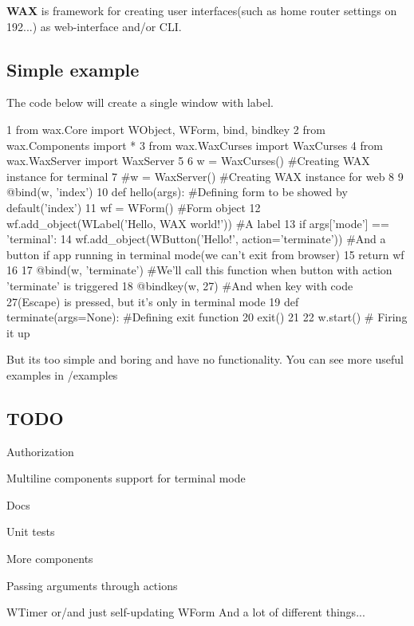 {\bfseries W\+AX} is framework for creating user interfaces(such as home router settings on 192...) as web-\/interface and/or C\+LI.

\subsection*{Simple example }

The code below will create a single window with label.


\begin{DoxyCode}
1 from wax.Core import WObject, WForm, bind, bindkey
2 from wax.Components import *
3 from wax.WaxCurses import WaxCurses
4 from wax.WaxServer import WaxServer
5 
6 w = WaxCurses()                                            #Creating WAX instance for terminal
7 #w = WaxServer()                                           #Creating WAX instance for web
8 
9 @bind(w, 'index')
10 def hello(args):                                           #Defining form to be showed by default('index')
11   wf = WForm()                                             #Form object
12   wf.add\_object(WLabel('Hello, WAX world!'))               #A label
13   if args['mode'] == 'terminal':
14     wf.add\_object(WButton('Hello!', action='terminate'))   #And a button if app running in terminal mode(we
       can't exit from browser)
15   return wf
16 
17 @bind(w, 'terminate')                                      #We'll call this function when button with
       action 'terminate' is triggered
18 @bindkey(w, 27)                                            #And when key with code 27(Escape) is pressed,
       but it's only in terminal mode
19 def terminate(args=None):                                  #Defining exit function
20   exit()
21 
22 w.start()                                                  # Firing it up
\end{DoxyCode}


But it\textquotesingle{}s too simple and boring and have no functionality. You can see more useful examples in {\ttfamily /examples}

\subsection*{T\+O\+DO }


\begin{DoxyItemize}
\item Authorization
\item Multiline components support for terminal mode
\item Docs
\item Unit tests
\item More components
\item Passing arguments through actions
\item W\+Timer or/and just self-\/updating W\+Form And a lot of different things... 
\end{DoxyItemize}